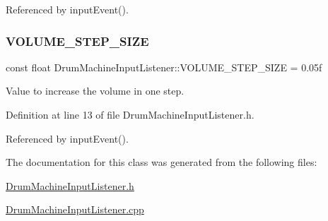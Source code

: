 Referenced by input\+Event().

\mbox{\label{class_drum_machine_input_listener_a983e85ff0ebfbb3de0a917134488570c}} 
\subsubsection{\texorpdfstring{V\+O\+L\+U\+M\+E\+\_\+\+S\+T\+E\+P\+\_\+\+S\+I\+ZE}{VOLUME\_STEP\_SIZE}}
{\footnotesize\ttfamily const float Drum\+Machine\+Input\+Listener\+::\+V\+O\+L\+U\+M\+E\+\_\+\+S\+T\+E\+P\+\_\+\+S\+I\+ZE = 0.\+05f\hspace{0.3cm}{\ttfamily [private]}}



Value to increase the volume in one step. 



Definition at line 13 of file Drum\+Machine\+Input\+Listener.\+h.



Referenced by input\+Event().



The documentation for this class was generated from the following files\+:\begin{DoxyCompactItemize}
\item 
\hyperlink{_drum_machine_input_listener_8h}{Drum\+Machine\+Input\+Listener.\+h}\item 
\hyperlink{_drum_machine_input_listener_8cpp}{Drum\+Machine\+Input\+Listener.\+cpp}\end{DoxyCompactItemize}
